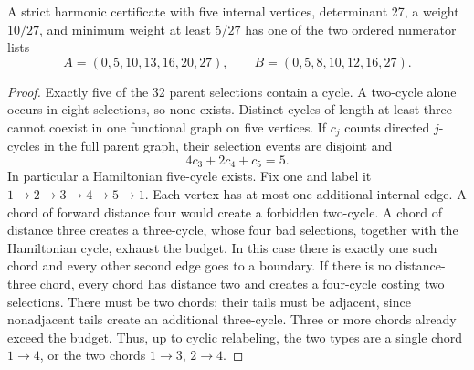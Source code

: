 \begin{lemma}\label{lem:27}
A strict harmonic certificate with five internal vertices, determinant 27, a weight $10/27$, and minimum weight at least $5/27$ has one of the two ordered numerator lists
\begin{equation}\label{eq:two-lists}
 A=(0,5,10,13,16,20,27),\qquad
 B=(0,5,8,10,12,16,27).
\end{equation}
\end{lemma}
\begin{proof}
Exactly five of the 32 parent selections contain a cycle. A two-cycle alone occurs in eight selections, so none exists. Distinct cycles of length at least three cannot coexist in one functional graph on five vertices. If $c_j$ counts directed $j$-cycles in the full parent graph, their selection events are disjoint and
\[
 4c_3+2c_4+c_5=5.
\]
In particular a Hamiltonian five-cycle exists. Fix one and label it $1\to2\to3\to4\to5\to1$. Each vertex has at most one additional internal edge. A chord of forward distance four would create a forbidden two-cycle. A chord of distance three creates a three-cycle, whose four bad selections, together with the Hamiltonian cycle, exhaust the budget. In this case there is exactly one such chord and every other second edge goes to a boundary. If there is no distance-three chord, every chord has distance two and creates a four-cycle costing two selections. There must be two chords; their tails must be adjacent, since nonadjacent tails create an additional three-cycle. Three or more chords already exceed the budget. Thus, up to cyclic relabeling, the two types are a single chord $1\to4$, or the two chords $1\to3$, $2\to4$.


\end{proof}
